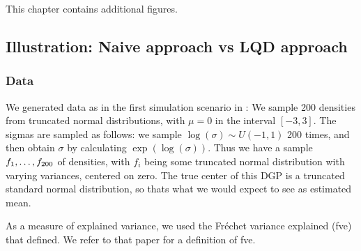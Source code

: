 This chapter contains additional figures.

\subsection{Illustration: Naive approach vs LQD approach}
\label{sec:illustration_lqd}

\subsubsection{Data}
\label{sec:dgp_descriptives}
We generated data as in the first simulation scenario in \textcite{PetersenMüller2016}:
We sample 200 densities from truncated normal distributions, with $\mu = 0$ in the
interval $[-3,3]$. The sigmas are sampled as follows: we sample $\log(\sigma) \sim U(-1,1)$
200 times, and then obtain $\sigma$ by calculating $\exp(\log(\sigma))$. Thus we have a sample
$f_1, \nobreak \dots, \nobreak f_{200}$ of densities, with $f_i$ being some truncated
normal distribution with varying variances, centered on zero. The true center of this DGP
is a truncated standard normal distribution, so thats what we would expect to see as
estimated mean.

As a measure of explained variance, we used the Fréchet variance explained (fve) that
\textcite{PetersenMüller2016} defined. We refer to that paper for a definition of fve.






